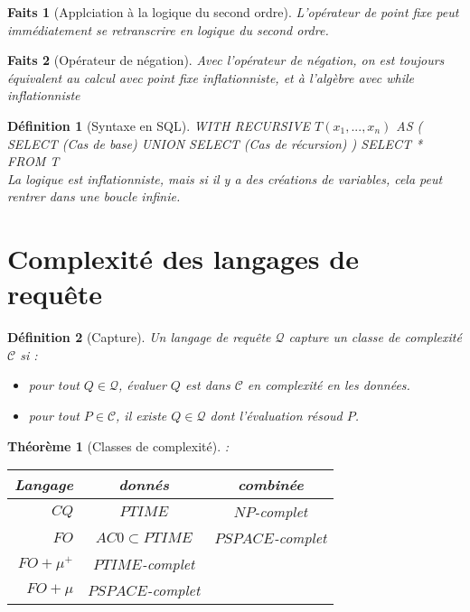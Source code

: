 \documentclass[landscape]{article}
\newcommand{\C}{\mathscr{C}}
\newcommand{\Q}{\mathscr{Q}}
\newcommand{\1}{\mathbbm{1}}
\newcommand{\0}{\mathbbm{0}}
\newtheorem{theo}{Théorème}
\newtheorem{defi}{Définition}
\newtheorem{fact}{Faits}
\begin{document}
\begin{multicols}{2}
    \begin{fact}[Applciation à la logique du second ordre]
      L'opérateur de point fixe peut immédiatement se retranscrire en logique du
      second ordre.
    \end{fact}

    \begin{fact}[Opérateur de négation]
      Avec l'opérateur de négation, on est toujours équivalent au calcul avec
      point fixe inflationniste, et à l'algèbre avec while inflationniste
    \end{fact}

    \begin{defi}[Syntaxe en SQL]
      WITH RECURSIVE $T(x_1,...,x_n)$ AS ( 
      SELECT (Cas de base)
      UNION
      SELECT (Cas de récursion)
      )
      SELECT * FROM T\\
      La logique est inflationniste, mais si il y a des créations de variables,
      cela peut rentrer dans une boucle infinie.
    \end{defi}

    \section{Complexité des langages de requête}

    \begin{defi}[Capture] Un langage de requête $\Q$ capture un classe de complexité
        $\C$ si :\begin{itemize}
            \item pour tout $Q\in\Q$, évaluer $Q$ est dans $\C$ en complexité
                en les données.
            \item pour tout $P\in\C$, il existe $Q\in\Q$ dont l'évaluation
                résoud $P$.
        \end{itemize}
    \end{defi}

    \begin{theo}[Classes de complexité]:\\
        \begin{tabular}{r|cc}
            \hline Langage & donnés & combinée \\
            \hline
            $CQ$ & $PTIME$ & $NP$-complet \\
            $FO$ & $AC0\subset PTIME$ & $PSPACE$-complet \\
            $FO+\mu^+$ & $PTIME$-complet & \\
            $FO+\mu$ & $PSPACE$-complet & \\
            \hline
        \end{tabular}
    \end{theo}


\end{multicols}
\end{document}
